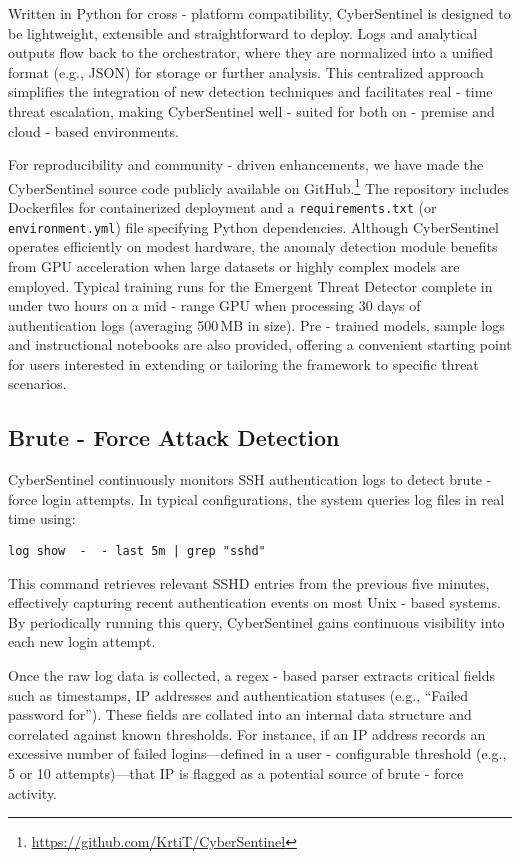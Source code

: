 \documentclass{article}
\begin{document}
Written in Python for cross - platform compatibility, CyberSentinel is designed to be lightweight, extensible and straightforward to deploy. Logs and analytical outputs flow back to the orchestrator, where they are normalized into a unified format (e.g., JSON) for storage or further analysis. This centralized approach simplifies the integration of new detection techniques and facilitates real - time threat escalation, making CyberSentinel well - suited for both on - premise and cloud - based environments. 

For reproducibility and community - driven enhancements, we have made the CyberSentinel source code publicly available on GitHub.\footnote{\url{https://github.com/KrtiT/CyberSentinel}} The repository includes Dockerfiles for containerized deployment and a \texttt{requirements.txt} (or \texttt{environment.yml}) file specifying Python dependencies. Although CyberSentinel operates efficiently on modest hardware, the anomaly detection module benefits from GPU acceleration when large datasets or highly complex models are employed. Typical training runs for the Emergent Threat Detector complete in under two hours on a mid - range GPU when processing 30 days of authentication logs (averaging 500\,MB in size). Pre - trained models, sample logs and instructional notebooks are also provided, offering a convenient starting point for users interested in extending or tailoring the framework to specific threat scenarios.

\subsection{Brute - Force Attack Detection}
CyberSentinel continuously monitors SSH authentication logs to detect brute - force login attempts. In typical configurations, the system queries log files in real time using:

\begin{verbatim}
log show  -  - last 5m | grep "sshd"
\end{verbatim}

This command retrieves relevant SSHD entries from the previous five minutes, effectively capturing recent authentication events on most Unix - based systems. By periodically running this query, CyberSentinel gains continuous visibility into each new login attempt.

Once the raw log data is collected, a regex - based parser extracts critical fields such as timestamps, IP addresses and authentication statuses (e.g., “Failed password for”). These fields are collated into an internal data structure and correlated against known thresholds. For instance, if an IP address records an excessive number of failed logins—defined in a user - configurable threshold (e.g., 5 or 10 attempts)—that IP is flagged as a potential source of brute - force activity.
\end{document}
